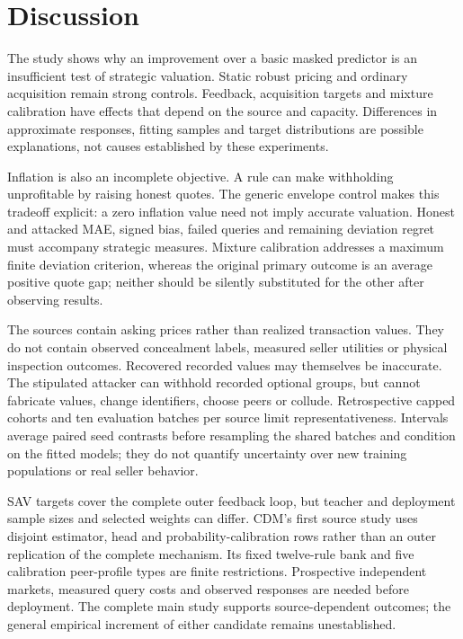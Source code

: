 \section{Discussion}
The study shows why an improvement over a basic masked predictor is an
insufficient test of strategic valuation. Static robust pricing and ordinary
acquisition remain strong controls. Feedback, acquisition targets and mixture
calibration have effects that depend on the source and capacity. Differences
in approximate responses, fitting samples and target distributions are possible
explanations, not causes established by these experiments.

Inflation is also an incomplete objective. A rule can make withholding
unprofitable by raising honest quotes. The generic envelope control makes this
tradeoff explicit: a zero inflation value need not imply accurate valuation.
Honest and attacked MAE, signed bias, failed queries and remaining deviation
regret must accompany strategic measures. Mixture calibration addresses a
maximum finite deviation criterion, whereas the original primary outcome is
an average positive quote gap; neither should be silently substituted for
the other after observing results.

The sources contain asking prices rather than realized transaction values.
They do not contain observed concealment labels, measured seller utilities or
physical inspection outcomes. Recovered recorded values may themselves be
inaccurate. The stipulated attacker can withhold recorded optional groups,
but cannot fabricate values, change identifiers, choose peers or collude.
Retrospective capped cohorts and ten evaluation batches per source limit
representativeness. Intervals average paired seed contrasts before resampling
the shared batches and condition on the fitted models; they do not quantify
uncertainty over new training populations or real seller behavior.

SAV targets cover the complete outer feedback loop, but teacher and deployment
sample sizes and selected weights can differ. CDM's first source study uses
disjoint estimator, head and probability-calibration rows rather than an outer
replication of the complete mechanism. Its fixed twelve-rule bank and five
calibration peer-profile types are finite restrictions. Prospective independent
markets, measured query costs and observed responses are needed before
deployment. The complete main study supports source-dependent outcomes; the
general empirical increment of either candidate remains unestablished.
